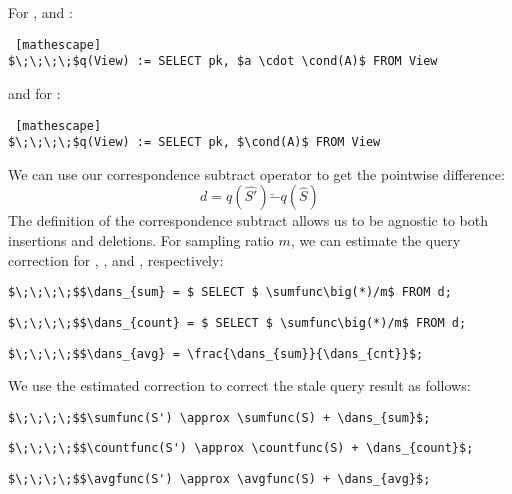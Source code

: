 \vspace{.5em}

\noindent For \sumfunc, and \avgfunc: 
\begin{lstlisting} [mathescape]
$\;\;\;\;$q(View) := SELECT pk, $a \cdot \cond(A)$ FROM View
\end{lstlisting}

\noindent and for \countfunc:
\begin{lstlisting} [mathescape]
$\;\;\;\;$q(View) := SELECT pk, $\cond(A)$ FROM View
\end{lstlisting}

We can use our correspondence subtract operator to get the pointwise difference:
\[d = q(\hat{S'}) \check{-} q(\hat{S})\]  
The definition of the correspondence subtract allows us to be agnostic to both insertions and deletions.
For sampling ratio $m$, we can estimate the query correction for \sumfunc, \countfunc, and \avgfunc, respectively:
\begin{lstlisting}[mathescape,basicstyle={\scriptsize}]
$\;\;\;\;$$\dans_{sum} = $ SELECT $ \sumfunc\big(*)/m$ FROM d;
\end{lstlisting}
\vspace{-1em}
\begin{lstlisting}[mathescape,basicstyle={\scriptsize}]
$\;\;\;\;$$\dans_{count} = $ SELECT $ \sumfunc\big(*)/m$ FROM d;
\end{lstlisting}
\vspace{-1em}
\begin{lstlisting}[mathescape,basicstyle={\scriptsize}]
$\;\;\;\;$$\dans_{avg} = \frac{\dans_{sum}}{\dans_{cnt}}$;
\end{lstlisting}
We use the estimated correction to correct the stale query result as follows:
\begin{lstlisting}[mathescape,basicstyle={\scriptsize}]
$\;\;\;\;$$\sumfunc(S') \approx \sumfunc(S) + \dans_{sum}$;
\end{lstlisting}
\vspace{-1em}
\begin{lstlisting}[mathescape,basicstyle={\scriptsize}]
$\;\;\;\;$$\countfunc(S') \approx \countfunc(S) + \dans_{count}$;
\end{lstlisting}
\vspace{-1em}
\begin{lstlisting}[mathescape,basicstyle={\scriptsize}]
$\;\;\;\;$$\avgfunc(S') \approx \avgfunc(S) + \dans_{avg}$;
\end{lstlisting}


